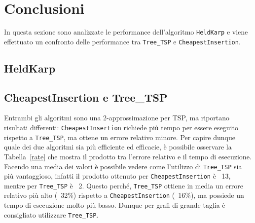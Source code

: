 \section{Conclusioni}
In questa sezione sono analizzate le performance dell'algoritmo \texttt{HeldKarp} e viene effettuato un confronto delle performance tra \texttt{Tree\_TSP} e \texttt{CheapestInsertion}.

\subsection{HeldKarp}

\subsection{CheapestInsertion e Tree\_TSP}
Entrambi gli algoritmi sono una 2-approssimazione per TSP, ma riportano risultati differenti: \texttt{CheapestInsertion} richiede più tempo per essere eseguito rispetto a \texttt{Tree\_TSP}, ma ottene un errore relativo minore. Per capire dunque quale dei due algoritmi sia più efficiente ed efficacie, è possibile osservare la Tabella~\ref{rate} che mostra il prodotto tra l'errore relativo e il tempo di esecuzione. Facendo una media dei valori è possibile vedere come l'utilizzo di \texttt{Tree\_TSP} sia più vantaggioso, infatti il prodotto ottenuto per \texttt{CheapestInsertion} è ~13, mentre per \texttt{Tree\_TSP} è ~2. Questo perché, \texttt{Tree\_TSP} ottiene in media un errore relativo più alto (~32\%) rispetto a \texttt{CheapestInsertion} (~16\%), ma possiede un tempo di esecuzione molto più basso. Dunque per grafi di grande taglia è consigliato utilizzare \texttt{Tree\_TSP}.

